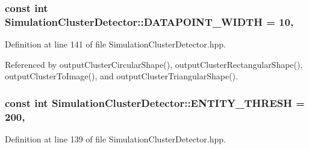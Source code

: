 \hypertarget{classmultiscale_1_1analysis_1_1SimulationClusterDetector_a16d99d22863feed83960e6b9efe407a2}{
\subsubsection[{D\-A\-T\-A\-P\-O\-I\-N\-T\-\_\-\-W\-I\-D\-T\-H}]{\setlength{\rightskip}{0pt plus 5cm}const int Simulation\-Cluster\-Detector\-::\-D\-A\-T\-A\-P\-O\-I\-N\-T\-\_\-\-W\-I\-D\-T\-H = 10\hspace{0.3cm}{\ttfamily [static]}, {\ttfamily [private]}}}\label{classmultiscale_1_1analysis_1_1SimulationClusterDetector_a16d99d22863feed83960e6b9efe407a2}


Definition at line 141 of file Simulation\-Cluster\-Detector.\-hpp.



Referenced by output\-Cluster\-Circular\-Shape(), output\-Cluster\-Rectangular\-Shape(), output\-Cluster\-To\-Image(), and output\-Cluster\-Triangular\-Shape().

\hypertarget{classmultiscale_1_1analysis_1_1SimulationClusterDetector_ad161524f0da7d2414e616fff59f02118}{
\subsubsection[{E\-N\-T\-I\-T\-Y\-\_\-\-T\-H\-R\-E\-S\-H}]{\setlength{\rightskip}{0pt plus 5cm}const int Simulation\-Cluster\-Detector\-::\-E\-N\-T\-I\-T\-Y\-\_\-\-T\-H\-R\-E\-S\-H = 200\hspace{0.3cm}{\ttfamily [static]}, {\ttfamily [private]}}}\label{classmultiscale_1_1analysis_1_1SimulationClusterDetector_ad161524f0da7d2414e616fff59f02118}


Definition at line 139 of file Simulation\-Cluster\-Detector.\-hpp.



